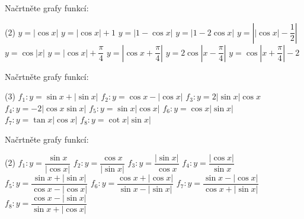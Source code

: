 \documentclass[12pt,a4paper]{article}
\begin{document}
\begin{exercise}
    Načrtněte grafy funkcí:
    \begin{tasks}(2)
        \task $y = \left|\cos x \right|$
        \task $y = \left|\cos x \right| + 1 $
        \task $y = \left|1 - \cos x \right| $
        \task $y = \left|1 - 2\cos x \right| $
        \task $y = \left|\left|\cos x \right| - \dfrac{1}{2}\right| $
        \task $y = \cos \left|x\right| $
        \task $y = \left|\cos x \right|+ \dfrac{\pi}{4} $
        \task $y = \left|\cos x + \dfrac{\pi}{4}\right| $
        \task $y = 2 \cos \left|x - \dfrac{\pi}{4}\right| $
        \task $y = \cos \left|x + \dfrac{\pi}{4}\right| - 2 $
    \end{tasks}
\end{exercise}


\begin{exercise}
    Načrtněte grafy funkcí:
    \begin{tasks}(3)
        \task $f_1: y = \sin x + \left| \sin x \right|$
        \task $f_2: y = \cos x - \left| \cos x \right|$
        \task $f_3: y = 2 \left| \sin x \right| \cos x$
        \task $f_4: y = -2\left| \cos x \sin x \right|$
        \task $f_5: y = \sin x \left| \cos x \right|$
        \task $f_6: y = \cos x \left| \sin x \right|$
        \task $f_7: y = \tan x \left| \cos x \right|$
        \task $f_8: y = \cot x \left| \sin x \right|$
    \end{tasks}
\end{exercise}


\begin{exercise}
    Načrtněte grafy funkcí:
    \begin{tasks}(2)
        \task $f_1: y = \dfrac{\sin x}{\left| \cos x \right|}$
        \task $f_2: y = \dfrac{\cos x}{\left| \sin x \right|}$
        \task $f_3: y = \dfrac{\left| \sin x \right|}{\cos x}$
        \task $f_4: y = \dfrac{\left| \cos x \right|}{\sin x}$
        \task $f_5: y = \dfrac{\sin x + \left| \sin x \right|}{\cos x - \left| \cos x \right|}$
        \task $f_6: y = \dfrac{\cos x + \left| \cos x \right|}{\sin x - \left| \sin x \right|}$
        \task $f_7: y = \dfrac{\sin x - \left| \cos x \right|}{\cos x + \left| \sin x \right|}$
        \task $f_8: y = \dfrac{\cos x - \left| \sin x \right|}{\sin x + \left| \cos x \right|}$
    \end{tasks}
\end{exercise}
\end{document}
